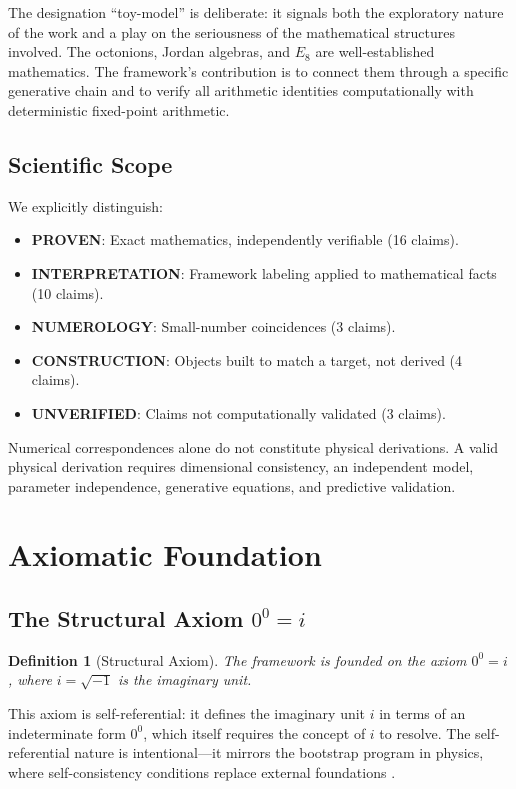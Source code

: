 \documentclass[11pt]{article}
\newtheorem{definition}{Definition}
\begin{document}
The designation ``toy-model'' is deliberate: it signals both the exploratory nature of the work and a play on the seriousness of the mathematical structures involved. The octonions, Jordan algebras, and $E_8$ are well-established mathematics. The framework's contribution is to connect them through a specific generative chain and to verify all arithmetic identities computationally with deterministic fixed-point arithmetic.

\subsection{Scientific Scope}

We explicitly distinguish:
\begin{itemize}
\item \textbf{PROVEN}: Exact mathematics, independently verifiable (16 claims).
\item \textbf{INTERPRETATION}: Framework labeling applied to mathematical facts (10 claims).
\item \textbf{NUMEROLOGY}: Small-number coincidences (3 claims).
\item \textbf{CONSTRUCTION}: Objects built to match a target, not derived (4 claims).
\item \textbf{UNVERIFIED}: Claims not computationally validated (3 claims).
\end{itemize}

Numerical correspondences alone do not constitute physical derivations. A valid physical derivation requires dimensional consistency, an independent model, parameter independence, generative equations, and predictive validation.

\section{Axiomatic Foundation}

\subsection{The Structural Axiom $0^0 = i$}

\begin{definition}[Structural Axiom]
The framework is founded on the axiom $0^0 = i$, where $i = \sqrt{-1}$ is the imaginary unit.
\end{definition}

This axiom is self-referential: it defines the imaginary unit $i$ in terms of an indeterminate form $0^0$, which itself requires the concept of $i$ to resolve. The self-referential nature is intentional---it mirrors the bootstrap program in physics, where self-consistency conditions replace external foundations \cite{chew1968bootstrap}.
\end{document}

